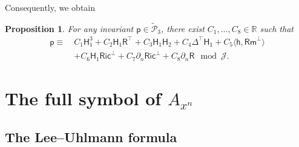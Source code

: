 \documentclass[11pt]{amsart}
\newtheorem{proposition}[theorem]{Proposition}
\theoremstyle{definition}
\numberwithin{equation}{section}
\begin{document}
Consequently, we obtain
\begin{proposition}\label{prop:decomforn=3}
 	For any invariant $\mathsf p \in \widetilde{\mathcal P}_3$, there exist $C_1,\dots,C_8\in\mathbb R$ such that
 	\begin{equation*}
 		\begin{aligned}
 			\mathsf p \equiv \ & C_1\mathsf H_1^3 + C_2\mathsf H_1\mathsf R^\top + C_3\mathsf H_1\mathsf H_2 + C_4\mathsf {\Delta^\top H_1} + C_5\langle \mathsf h, \mathsf {Rm}^\bot\rangle \\
 			& + C_6\mathsf H_1\mathsf{Ric}^\bot + C_7\partial_n\mathsf{Ric}^\bot + C_8\partial_n\mathsf R\mod\mathcal J.
 		\end{aligned}
    \end{equation*}
\end{proposition}
 

\section{The full symbol of $A_{x^n}$}\label{sec: full symbol}

\subsection{The Lee--Uhlmann formula}\label{subsec: L-U}
\end{document}
